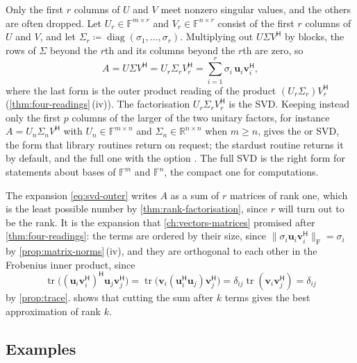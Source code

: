 Only the first $r$ columns of $U$ and $V$ meet nonzero singular values, and the others are often dropped. Let $U_r\in\mathbb F^{m\times r}$ and $V_r\in\mathbb F^{n\times r}$ consist of the first $r$ columns of $U$ and $V$, and let $\Sigma_r\coloneqq\operatorname{diag}(\sigma_1,\ldots,\sigma_r)$. Multiplying out $U\Sigma V^{\mathsf H}$ by blocks, the rows of $\Sigma$ beyond the $r$th and its columns beyond the $r$th are zero, so
\begin{equation}
A=U\Sigma V^{\mathsf H}=U_r\Sigma_rV_r^{\mathsf H}=\sum_{i=1}^r\sigma_i\,\mathbf u_i\mathbf v_i^{\mathsf H},
\label{eq:svd-outer}
\end{equation}
where the last form is the outer product reading of the product $(U_r\Sigma_r)V_r^{\mathsf H}$ (\cref{thm:four-readings}\,(iv)). The factorisation $U_r\Sigma_rV_r^{\mathsf H}$ is the  SVD. Keeping instead only the first $p$ columns of the larger of the two unitary factors, for instance $A=U_n\Sigma_nV^{\mathsf H}$ with $U_n\in\mathbb F^{m\times n}$ and $\Sigma_n\in\mathbb R^{n\times n}$ when $m\ge n$, gives the  or  SVD, the form that library routines return on request; the stardust routine  returns it by default, and the full one with the option . The full SVD is the right form for statements about bases of $\mathbb F^m$ and $\mathbb F^n$, the compact one for computations.

The expansion \eqref{eq:svd-outer} writes $A$ as a sum of $r$ matrices of rank one, which is the least possible number by \cref{thm:rank-factorisation}, since $r$ will turn out to be the rank. It is the expansion that \cref{ch:vectors-matrices} promised after \cref{thm:four-readings}: the terms are ordered by their size, since $\|\sigma_i\mathbf u_i\mathbf v_i^{\mathsf H}\|_{\mathrm F}=\sigma_i$ by \cref{prop:matrix-norms}\,(iv), and they are orthogonal to each other in the Frobenius inner product, since
\[
\operatorname{tr}\bigl((\mathbf u_i\mathbf v_i^{\mathsf H})^{\mathsf H}\mathbf u_j\mathbf v_j^{\mathsf H}\bigr)=\operatorname{tr}\bigl(\mathbf v_i(\mathbf u_i^{\mathsf H}\mathbf u_j)\mathbf v_j^{\mathsf H}\bigr)=\delta_{ij}\operatorname{tr}(\mathbf v_i\mathbf v_j^{\mathsf H})=\delta_{ij}
\]
by \cref{prop:trace}.  shows that cutting the sum after $k$ terms gives the best approximation of rank $k$.

\subsection{Examples}

